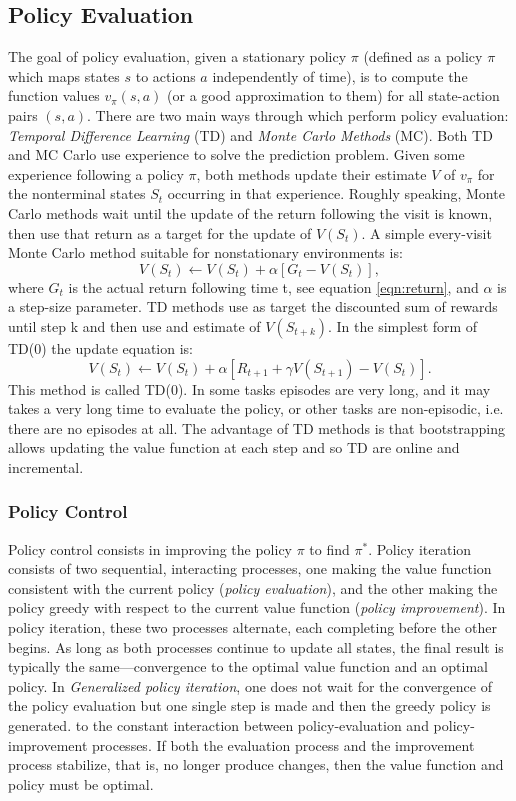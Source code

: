 \subsection{Policy Evaluation} 
The goal of policy evaluation, given a stationary policy $\pi$ (defined as a policy $\pi$ which maps states $s$ to actions $a$ independently of time), is to compute the function values  $v_{\pi }(s,a)$ (or a good approximation to them) for all state-action pairs $(s,a)$. 
There are two main ways through which perform policy evaluation: \textit{Temporal Difference Learning} (TD) and \textit{Monte Carlo Methods} (MC).
Both TD and MC Carlo use experience to solve the prediction problem. Given some experience following a policy $\pi$, both methods update their estimate $V$ of $v_\pi$ for the nonterminal states $S_t$ occurring in that experience. Roughly speaking, Monte Carlo methods wait until the update of the return following the visit is known, then use that return as a target for the update of $V(S_t)$. A simple every-visit Monte Carlo method suitable for nonstationary environments is: \begin{equation}V(S_t)\leftarrow V(S_t)+\alpha\left[G_t-V(S_t)\right],\end{equation} where $G_t$ is the actual return following time t, see equation \ref{eqn:return}, and $\alpha$ is a step-size parameter.
TD methods use as target the discounted sum of rewards until step k and then use and estimate of $V(S_{t+k})$. In the simplest form of TD(0) the update equation is: \begin{equation}V(S_t)\leftarrow V(S_t)+\alpha \left[R_{t+1}+\gamma V(S_{t+1})-V(S_t)\right].\end{equation} This method is called TD(0). In some tasks episodes are very long, and it may takes a very long time to evaluate the policy, or other tasks are non-episodic, i.e. there are no episodes at all. The advantage of TD methods is that bootstrapping allows updating the value function at each step and so TD are online and incremental.

\subsubsection{Policy Control}
Policy control consists in improving the policy $\pi$ to find $\pi^*$.
Policy iteration consists of two sequential, interacting processes, one making the value function consistent with the current policy (\textit{policy evaluation}), and the other making the policy greedy with respect to the current value function (\textit{policy improvement}). In policy iteration, these two processes alternate, each completing before the other begins. As long as both processes continue to update all states, the final result is typically the same—convergence to the optimal value function and an optimal policy. In \textit{Generalized policy iteration}, one does not wait for the convergence of the policy evaluation but one single step is made and then the greedy policy is generated. to the constant interaction between policy-evaluation and policy-improvement processes. If both the evaluation process and the improvement process stabilize, that is, no longer produce changes, then the value function and policy must be optimal.


